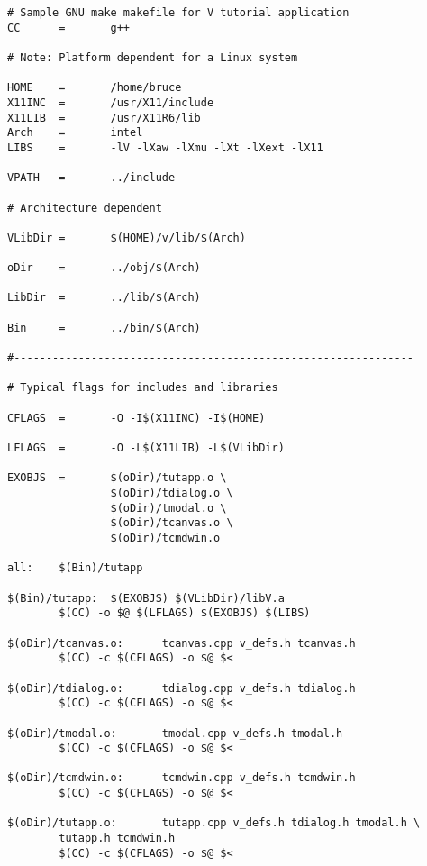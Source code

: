 %
\footnotesize
\begin{verbatim}
# Sample GNU make makefile for V tutorial application
CC      =       g++

# Note: Platform dependent for a Linux system

HOME    =       /home/bruce
X11INC  =       /usr/X11/include
X11LIB  =       /usr/X11R6/lib
Arch    =       intel
LIBS    =       -lV -lXaw -lXmu -lXt -lXext -lX11

VPATH   =       ../include

# Architecture dependent

VLibDir =       $(HOME)/v/lib/$(Arch)

oDir    =       ../obj/$(Arch)

LibDir  =       ../lib/$(Arch)

Bin     =       ../bin/$(Arch)

#--------------------------------------------------------------

# Typical flags for includes and libraries

CFLAGS  =       -O -I$(X11INC) -I$(HOME)

LFLAGS  =       -O -L$(X11LIB) -L$(VLibDir)

EXOBJS  =       $(oDir)/tutapp.o \
                $(oDir)/tdialog.o \
                $(oDir)/tmodal.o \
                $(oDir)/tcanvas.o \
                $(oDir)/tcmdwin.o

all:    $(Bin)/tutapp

$(Bin)/tutapp:  $(EXOBJS) $(VLibDir)/libV.a
        $(CC) -o $@ $(LFLAGS) $(EXOBJS) $(LIBS)

$(oDir)/tcanvas.o:      tcanvas.cpp v_defs.h tcanvas.h
        $(CC) -c $(CFLAGS) -o $@ $<                     

$(oDir)/tdialog.o:      tdialog.cpp v_defs.h tdialog.h
        $(CC) -c $(CFLAGS) -o $@ $<                     

$(oDir)/tmodal.o:       tmodal.cpp v_defs.h tmodal.h
        $(CC) -c $(CFLAGS) -o $@ $<                     

$(oDir)/tcmdwin.o:      tcmdwin.cpp v_defs.h tcmdwin.h
        $(CC) -c $(CFLAGS) -o $@ $<                     

$(oDir)/tutapp.o:       tutapp.cpp v_defs.h tdialog.h tmodal.h \
        tutapp.h tcmdwin.h
        $(CC) -c $(CFLAGS) -o $@ $<
\end{verbatim}
\normalfont\normalsize
